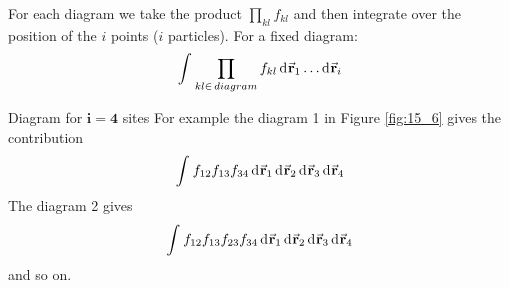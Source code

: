 \documentclass[../../Main/Main.tex]{subfiles}
\begin{document}
For each diagram we take the product \( \prod_{kl}^{} f_{kl}   \) and then integrate over the position of the \( i \) points (\( i \) particles). For a fixed diagram:
\begin{equation*}
  \int_{}^{} \prod_{kl \in \, diagram }^{} f_{kl} \dd[]{\va{r}_1} \dots \dd[]{\va{r}_i}
\end{equation*}

\begin{example}{Diagram for \( \pmb{i=4} \) sites}{}
  For example the diagram 1 in Figure \ref{fig:15_6} gives the contribution
  \begin{equation*}
    \int_{}^{} f_{12} f_{13} f_{34} \dd[]{\va{r}_1}  \dd[]{\va{r}_2} \dd[]{\va{r}_3} \dd[]{\va{r}_4}
  \end{equation*}
  The diagram 2 gives
  \begin{equation*}
    \int_{}^{} f_{12} f_{13} f_{23} f_{34} \dd[]{\va{r}_1}  \dd[]{\va{r}_2} \dd[]{\va{r}_3} \dd[]{\va{r}_4}
  \end{equation*}
  and so on.
\end{example}
\end{document}

